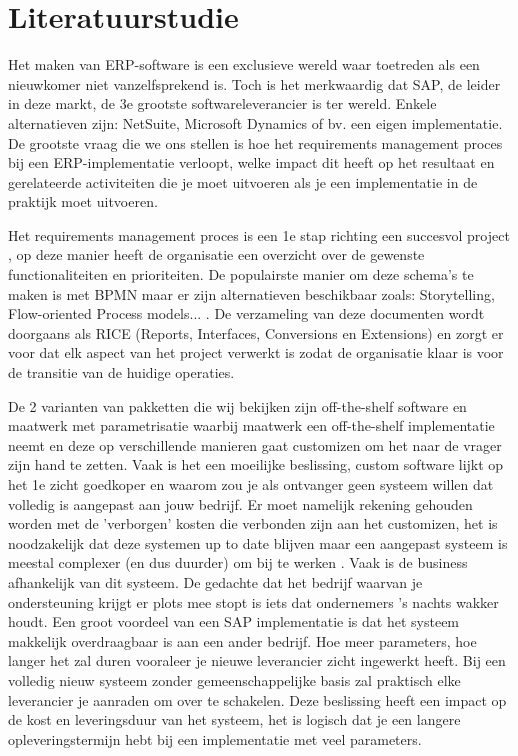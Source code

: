 
\chapter{Literatuurstudie}
\label{ch:literatuurstudie}

Het maken van ERP-software is een exclusieve wereld waar toetreden als een nieuwkomer niet vanzelfsprekend is. Toch is het merkwaardig dat SAP, de leider in deze markt, de 3e grootste softwareleverancier is ter wereld. Enkele alternatieven zijn: NetSuite, Microsoft Dynamics of bv. een eigen implementatie.
De grootste vraag die we ons stellen is hoe het requirements management proces bij een ERP-implementatie verloopt, welke impact dit heeft op het resultaat en gerelateerde activiteiten die je moet uitvoeren als je een implementatie in de praktijk moet uitvoeren. 

Het requirements management proces is een 1e stap richting een succesvol project \autocite{Williamson2018}, op deze manier heeft de organisatie een overzicht over de gewenste functionaliteiten en prioriteiten. De populairste manier om deze schema's te maken is met BPMN maar er zijn alternatieven beschikbaar zoals: Storytelling, Flow-oriented Process models... \autocite{Lillehagen2009}. De verzameling van deze documenten wordt doorgaans als RICE (Reports, Interfaces, Conversions en Extensions) \autocite{Williamson2018} en zorgt er voor dat elk aspect van het project verwerkt is zodat de organisatie klaar is voor de transitie van de huidige operaties. 

De 2 varianten van pakketten die wij bekijken zijn off-the-shelf software en maatwerk met parametrisatie waarbij maatwerk een off-the-shelf implementatie neemt en deze op verschillende manieren gaat customizen om het naar de vrager zijn hand te zetten. Vaak is het een moeilijke beslissing, custom software lijkt op het 1e zicht goedkoper en waarom zou je als ontvanger geen systeem willen dat volledig is aangepast aan jouw bedrijf. Er moet namelijk rekening gehouden worden met de 'verborgen' kosten die verbonden zijn aan het customizen, het is noodzakelijk dat deze systemen up to date blijven maar een aangepast systeem is meestal complexer (en dus duurder) om bij te werken \autocite{Bdc2019}. Vaak is de business afhankelijk van dit systeem. De gedachte dat het bedrijf waarvan je ondersteuning krijgt er plots mee stopt is iets dat ondernemers 's nachts wakker houdt. Een groot voordeel van een SAP implementatie is dat het systeem makkelijk overdraagbaar is aan een ander bedrijf. Hoe meer parameters, hoe langer het zal duren vooraleer je nieuwe leverancier zicht ingewerkt heeft. Bij een volledig nieuw systeem zonder gemeenschappelijke basis zal praktisch elke leverancier je aanraden om over te schakelen. Deze beslissing heeft een impact op de kost en leveringsduur van het systeem, het is logisch dat je een langere opleveringstermijn hebt bij een implementatie met veel parameters.

